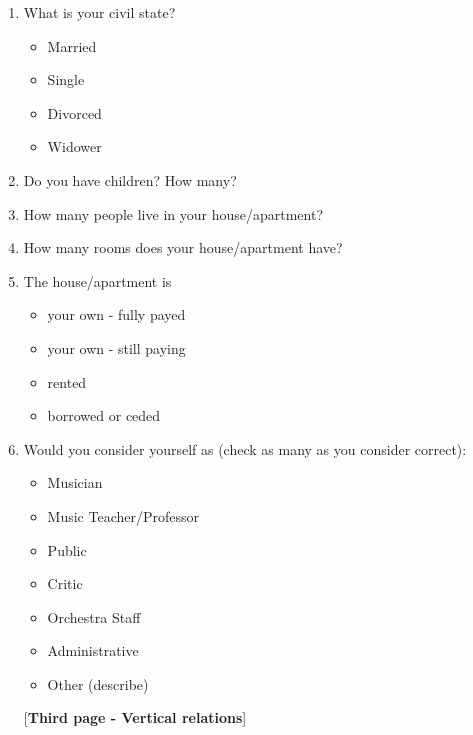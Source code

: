 \documentclass[a4paper, 12pt, openright, oneside, german, french, brazil, english]{abntex2}
\begin{document}
\begin{enumerate}
        \item What is your civil state?
          \begin{itemize}
          \item Married
          \item Single
          \item Divorced
          \item Widower
          \end{itemize}

         
        \item Do you have children? How many?

        \item How many people live in your house/apartment?
        \item How many rooms does your house/apartment have?
          
        \item The house/apartment is
          \begin{itemize}
          \item your own - fully payed
          \item your own - still paying
          \item rented
          \item borrowed or ceded
          \end{itemize}
          
        \item Would you consider yourself as (check as many as you consider correct):
          \begin{itemize}
          \item Musician
          \item Music Teacher/Professor
          \item Public
          \item Critic
          \item Orchestra Staff
          \item Administrative
          \item Other (describe)
          \end{itemize}


        [\textbf{Third page - Vertical relations}]  


\end{enumerate}
\end{document}
